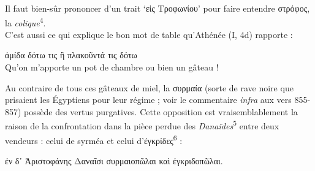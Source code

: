 \documentclass[12pt]{book}%
\newcommand{\italique}[1]{\textit{#1}}%
\newcommand{\citComm}[1]{\begin{quoting}[vskip=0pt] #1 \end{quoting}}%
\newcommand{\marqueur}[1]{\textsuperscript{#1}}%
\newenvironment{groupe}{%
\pstart%
\ledgroup%
}{%
\pend %
}%
\begin{document}
\begin{pages}
\begin{Leftside}
\begin{groupe}
{{Il faut bien-sûr prononcer d'un trait `εἰς Τροφωνίου' pour faire entendre στρόφος, la \italique{colique}\marqueur{4}.\\
C'est aussi ce qui explique le bon mot de table qu'Athénée (I, 4d) rapporte :%
\citComm{ἀμίδα δότω τις ἢ πλακοῦντά τις δότω\\
Qu'on m'apporte un pot de chambre ou bien un gâteau !}%
Au contraire de tous ces gâteaux de miel, la συρμαία (sorte de rave noire que prisaient les Égyptiens pour leur régime ; voir le commentaire \italique{infra} aux vers 855-857) possède des vertus purgatives. 
Cette opposition est vraisemblablement la raison de la confrontation dans la pièce perdue des \italique{Danaïdes}\marqueur{5} entre deux vendeurs : celui de syrméa et celui d'ἐγκρίδες\marqueur{6} :%
\citComm{ἐν δ᾿ Ἀριστοφάνης Δαναΐσι συρμαιοπῶλαι καὶ ἐγκριδοπῶλαι.}%
}}
\end{groupe}
\end{Leftside}
\end{pages}
\end{document}
